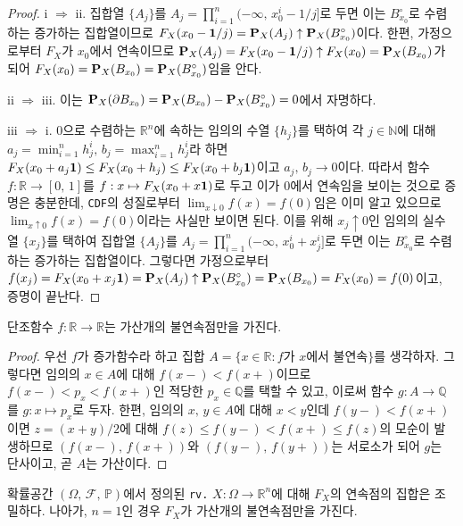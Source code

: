\begin{proof}
    i $\Rightarrow$ ii. 집합열 $\{A_j\}$를 $A_j=\prod_{i=1}^n(-\infty,\,x_0^i-1/j]$로 두면 이는 $B_{x_0}^\circ$로 수렴하는 증가하는 집합열이므로 $F_X(x_0-\mathbf{1}/j)=\mathbf{P}_X(A_j)\uparrow\mathbf{P}_X(B_{x_0}^\circ)$이다. 한편, 가정으로부터 $F_X$가 $x_0$에서 연속이므로 $\mathbf{P}_X(A_j)=F_X(x_0-\mathbf{1}/j)\uparrow F_X(x_0)=\mathbf{P}_X(B_{x_0})$가 되어 $F_X(x_0)=\mathbf{P}_X(B_{x_0})=\mathbf{P}_X(B_{x_0}^\circ)$임을 안다.

    ii $\Rightarrow$ iii. 이는 $\mathbf{P}_X(\partial B_{x_0})=\mathbf{P}_X(B_{x_0})-\mathbf{P}_X(B_{x_0}^\circ)=0$에서 자명하다.

    iii $\Rightarrow$ i. $0$으로 수렴하는 $\mathbb{R}^n$에 속하는 임의의 수열 $\{h_j\}$를 택하여 각 $j\in\mathbb{N}$에 대해 $a_j=\min_{i=1}^nh_j^i,\,b_j=\max_{i=1}^nh_j^i$라 하면 $F_X(x_0+a_j\mathbf{1})\leq F_X(x_0+h_j)\leq F_X(x_0+b_j\mathbf{1})$이고 $a_j,\,b_j\to 0$이다. 따라서 함수 $f:\mathbb{R}\to[0,\,1]$를 $f:x\mapsto F_X(x_0+x\mathbf{1})$로 두고 이가 $0$에서 연속임을 보이는 것으로 증명은 충분한데, \texttt{CDF}의 성질로부터 $\lim_{x\downarrow0}f(x)=f(0)$임은 이미 알고 있으므로 $\lim_{x\uparrow0}f(x)=f(0)$이라는 사실만 보이면 된다. 이를 위해 $x_j\uparrow0$인 임의의 실수열 $\{x_j\}$를 택하여 집합열 $\{A_j\}$를 $A_j=\prod_{i=1}^n(-\infty,\,x_0^i+x_j^i]$로 두면 이는 $B_{x_0}^\circ$로 수렴하는 증가하는 집합열이다. 그렇다면 가정으로부터 $f(x_j)=F_X(x_0+x_j\mathbf{1})=\mathbf{P}_X(A_j)\uparrow\mathbf{P}_X(B_{x_0}^\circ)=\mathbf{P}_X(B_{x_0})=F_X(x_0)=f(0)$이고, 증명이 끝난다.
\end{proof}

\begin{lemma}
    단조함수 $f:\mathbb{R}\to\mathbb{R}$는 가산개의 불연속점만을 가진다.
\end{lemma}

\begin{proof}
    우선 $f$가 증가함수라 하고 집합 $A=\{x\in\mathbb{R}:f\textrm{가 $x$에서 불연속}\}$를 생각하자. 그렇다면 임의의 $x\in A$에 대해 $f(x-)<f(x+)$이므로 $f(x-)<p_x<f(x+)$인 적당한 $p_x\in\mathbb{Q}$를 택할 수 있고, 이로써 함수 $g:A\to\mathbb{Q}$를 $g:x\mapsto p_x$로 두자. 한편, 임의의 $x,\,y\in A$에 대해 $x<y$인데 $f(y-)<f(x+)$이면 $z=(x+y)/2$에 대해 $f(z)\leq f(y-)<f(x+)\leq f(z)$의 모순이 발생하므로 $(f(x-),\,f(x+))$와 $(f(y-),\,f(y+))$는 서로소가 되어 $g$는 단사이고, 곧 $A$는 가산이다.
\end{proof}

\begin{theorem}
    확률공간 $(\Omega,\,\mathcal{F},\,\mathbb{P})$에서 정의된 \texttt{rv.} $X:\Omega\to\mathbb{R}^n$에 대해 $F_X$의 연속점의 집합은 조밀하다. 나아가, $n=1$인 경우 $F_X$가 가산개의 불연속점만을 가진다.
\end{theorem}


